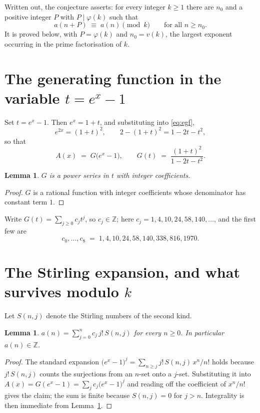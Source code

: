 \documentclass[11pt,a4paper]{article}
\theoremstyle{plain}
\newtheorem{lemma}[theorem]{Lemma}
\theoremstyle{definition}
\begin{document}
Written out, the conjecture asserts: for every integer $k\ge 1$ there are $n_0$ and a
positive integer $P$ with $P\mid\varphi(k)$ such that
\begin{equation}\label{eq:conj}
a(n+P)\;\equiv\;a(n)\pmod{k}\qquad\text{for all } n\ge n_0 .
\end{equation}
It is proved below, with $P=\varphi(k)$ and $n_0=v(k)$, the largest exponent occurring in
the prime factorisation of $k$.

\section{The generating function in the variable $t=e^{x}-1$}

Set $t=e^{x}-1$. Then $e^{x}=1+t$, and substituting into \eqref{eq:egf},
\[
e^{2x}=(1+t)^{2},\qquad 2-(1+t)^{2}=1-2t-t^{2},
\]
so that
\begin{equation}\label{eq:G}
A(x)\;=\;G\bigl(e^{x}-1\bigr),\qquad
G(t)\;=\;\frac{(1+t)^{2}}{1-2t-t^{2}}.
\end{equation}

\begin{lemma}\label{lem:int}
$G$ is a power series in $t$ with integer coefficients.
\end{lemma}

\begin{proof}
$G$ is a rational function with integer coefficients whose denominator has constant term $1$.
\end{proof}

Write $G(t)=\sum_{j\ge0}c_j t^{j}$, so $c_j\in\mathbb{Z}$; here $c_j = 1, 4, 10, 24, 58, 140, \dots$, and the
first few are
\[
c_0,\dots,c_8 \;=\; 1, 4, 10, 24, 58, 140, 338, 816, 1970.
\]

\section{The Stirling expansion, and what survives modulo $k$}

Let $S(n,j)$ denote the Stirling numbers of the second kind.

\begin{lemma}\label{lem:stir}
$a(n)=\sum_{j=0}^{n} c_j\, j!\, S(n,j)$ for every $n\ge 0$. In particular $a(n)\in\mathbb{Z}$.
\end{lemma}

\begin{proof}
The standard expansion $\bigl(e^{x}-1\bigr)^{j}
=\sum_{n\ge j} j!\,S(n,j)\,x^{n}/n!$ holds because $j!\,S(n,j)$ counts the surjections
from an $n$-set onto a $j$-set. Substituting it into
$A(x)=G(e^{x}-1)=\sum_j c_j\bigl(e^{x}-1\bigr)^{j}$ and reading off the coefficient of
$x^{n}/n!$ gives the claim; the sum is finite because $S(n,j)=0$ for $j>n$. Integrality is
then immediate from Lemma~\ref{lem:int}.
\end{proof}
\end{document}

